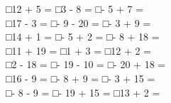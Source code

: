\documentclass[uplatex,
paper=a4,
fontsize=18pt,
jafontsize=16pt,
number_of_lines=30,
line_length=30zh,
baselineskip=25pt,
]{jlreq}
\begin{document}
□\hspace{1em}12 + 5 =\hspace{2em} □\hspace{1em}3 - 8 =\hspace{2em} □\hspace{1em}- 5 + 7 =\hspace{2em} 
\\

□\hspace{1em}17 - 3 =\hspace{2em} □\hspace{1em}- 9 - 20 =\hspace{2em} □\hspace{1em}- 3 + 9 =\hspace{2em} 
\\

□\hspace{1em}14 + 1 =\hspace{2em} □\hspace{1em}- 5 + 2 =\hspace{2em} □\hspace{1em}- 8 + 18 =\hspace{2em} 
\\

□\hspace{1em}11 + 19 =\hspace{2em} □\hspace{1em}1 + 3 =\hspace{2em} □\hspace{1em}12 + 2 =\hspace{2em} 
\\

□\hspace{1em}2 - 18 =\hspace{2em} □\hspace{1em}- 19 - 10 =\hspace{2em} □\hspace{1em}- 20 + 18 =\hspace{2em} 
\\

□\hspace{1em}16 - 9 =\hspace{2em} □\hspace{1em}- 8 + 9 =\hspace{2em} □\hspace{1em}- 3 + 15 =\hspace{2em} 
\\

□\hspace{1em}- 8 - 9 =\hspace{2em} □\hspace{1em}- 19 + 15 =\hspace{2em} □\hspace{1em}13 + 2 =\hspace{2em} 
\\
\end{document}
